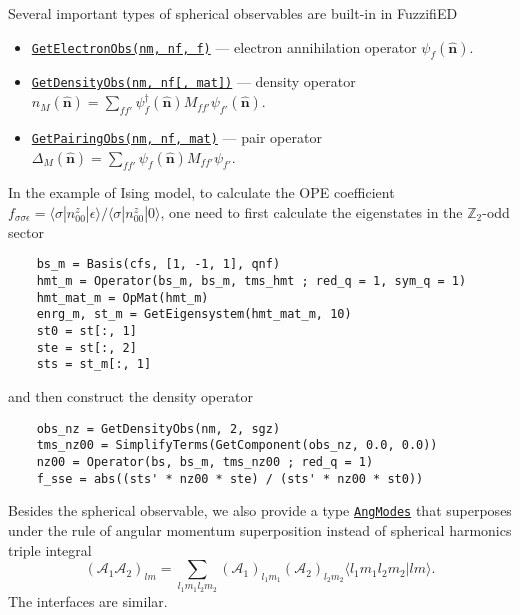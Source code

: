 \documentclass{timesjhep}
\begin{document}
Several important types of spherical observables are built-in in FuzzifiED 
\begin{itemize}
    \item \href{https://docs.fuzzified.world/models/\#FuzzifiED.GetElectronObs-Tuple{Int64,\%20Int64,\%20Int64}}{\lstinline|GetElectronObs(nm, nf, f)|} --- electron annihilation operator $\psi_f(\hat{\mathbf{n}})$.
    \item \href{https://docs.fuzzified.world/models/\#FuzzifiED.GetDensityObs-Tuple{Int64,\%20Int64,\%20Matrix{\%3C:Number}}}{\lstinline|GetDensityObs(nm, nf[, mat])|} --- density operator $n_M(\hat{\mathbf{n}})=\sum_{ff'}\psi^\dagger_{f}(\hat{\mathbf{n}})M_{ff'}\psi_{f'}(\hat{\mathbf{n}})$.
    \item \href{https://docs.fuzzified.world/models/\#FuzzifiED.GetPairingObs-Tuple{Int64,\%20Int64,\%20Matrix{\%3C:Number}}}{\lstinline|GetPairingObs(nm, nf, mat)|} --- pair operator $\Delta_M(\hat{\mathbf{n}})=\sum_{ff'}\psi_{f}(\hat{\mathbf{n}})M_{ff'}\psi_{f'}$. 
\end{itemize} 

In the example of Ising model, to calculate the OPE coefficient $f_{\sigma\sigma\epsilon}=\langle \sigma|n^z_{00}|\epsilon\rangle/\langle \sigma|n^z_{00}|0\rangle$, one need to first calculate the eigenstates in the $\mathbb{Z}_2$-odd sector
\begin{lstlisting}
    bs_m = Basis(cfs, [1, -1, 1], qnf)
    hmt_m = Operator(bs_m, bs_m, tms_hmt ; red_q = 1, sym_q = 1) 
    hmt_mat_m = OpMat(hmt_m)
    enrg_m, st_m = GetEigensystem(hmt_mat_m, 10)
    st0 = st[:, 1] 
    ste = st[:, 2] 
    sts = st_m[:, 1]
\end{lstlisting}
and then construct the density operator
\begin{lstlisting}
    obs_nz = GetDensityObs(nm, 2, sgz)
    tms_nz00 = SimplifyTerms(GetComponent(obs_nz, 0.0, 0.0))
    nz00 = Operator(bs, bs_m, tms_nz00 ; red_q = 1) 
    f_sse = abs((sts' * nz00 * ste) / (sts' * nz00 * st0))
\end{lstlisting}

Besides the spherical observable, we also provide a type \href{https://docs.fuzzified.world/models/\#FuzzifiED.AngModes}{\lstinline|AngModes|} that superposes under the rule of angular momentum superposition instead of spherical harmonics triple integral
\begin{equation}
    (\mathcal{A}_1\mathcal{A}_2)_{lm}=\sum_{l_1m_1l_2m_2}(\mathcal{A}_1)_{l_1m_1}(\mathcal{A}_2)_{l_2m_2}\langle l_1m_1l_2m_2|lm\rangle.
\end{equation}
The interfaces are similar.
\end{document}
